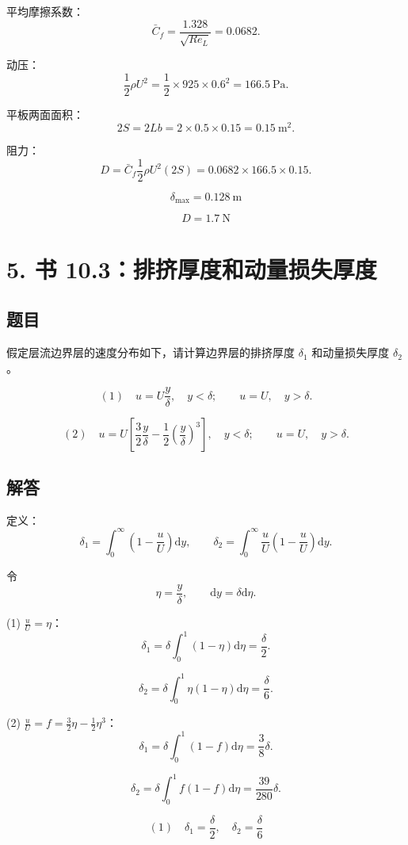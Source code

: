 ﻿\documentclass[11pt,a4paper]{ctexart}
\newcommand{\dd}{\mathrm{d}}
\begin{document}
平均摩擦系数：
\[
\bar C_f=\frac{1.328}{\sqrt{Re_L}}=0.0682.
\]

动压：
\[
\frac12\rho U^2=\frac12\times925\times0.6^2=166.5\ \mathrm{Pa}.
\]

平板两面面积：
\[
2S=2Lb=2\times0.5\times0.15=0.15\ \mathrm{m^2}.
\]

阻力：
\[
D=\bar C_f\frac12\rho U^2(2S)
=0.0682\times166.5\times0.15.
\]

\[
\boxed{\delta_{\max}=0.128\ \mathrm{m}}
\]

\[
\boxed{D=1.7\ \mathrm{N}}
\]

\section*{5. 书 10.3：排挤厚度和动量损失厚度}

\subsection*{题目}

假定层流边界层的速度分布如下，请计算边界层的排挤厚度 \(\delta_1\) 和动量损失厚度 \(\delta_2\)。

\[
(1)\quad u=U\frac{y}{\delta},\quad y<\delta;\qquad u=U,\quad y>\delta.
\]

\[
(2)\quad u=U\left[\frac{3}{2}\frac{y}{\delta}
-\frac{1}{2}\left(\frac{y}{\delta}\right)^3\right],
\quad y<\delta;\qquad u=U,\quad y>\delta.
\]

\subsection*{解答}

定义：
\[
\delta_1=\int_0^\infty\left(1-\frac{u}{U}\right)\dd y,\qquad
\delta_2=\int_0^\infty\frac{u}{U}\left(1-\frac{u}{U}\right)\dd y.
\]

令
\[
\eta=\frac{y}{\delta},\qquad \dd y=\delta\dd\eta.
\]

(1) \(\frac{u}{U}=\eta\)：
\[
\delta_1=\delta\int_0^1(1-\eta)\dd\eta=\frac{\delta}{2}.
\]

\[
\delta_2=\delta\int_0^1\eta(1-\eta)\dd\eta=\frac{\delta}{6}.
\]

(2) \(\frac{u}{U}=f=\frac32\eta-\frac12\eta^3\)：
\[
\delta_1=\delta\int_0^1(1-f)\dd\eta=\frac{3}{8}\delta.
\]

\[
\delta_2=\delta\int_0^1f(1-f)\dd\eta=\frac{39}{280}\delta.
\]

\[
\boxed{(1)\quad \delta_1=\frac{\delta}{2},\quad \delta_2=\frac{\delta}{6}}
\]
\end{document}
